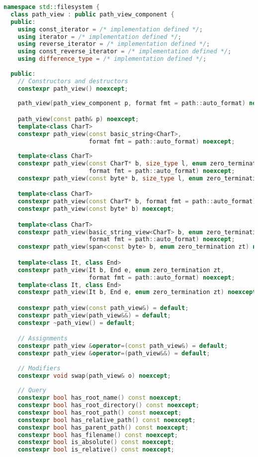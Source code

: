 \documentclass[11pt]{article}
\begin{document}
\begin{lstlisting}[language=cpp]
namespace std::filesystem {
  class path_view : public path_view_component {
  public:
    using const_iterator = /* implementation defined */;
    using iterator = /* implementation defined */;
    using reverse_iterator = /* implementation defined */;
    using const_reverse_iterator = /* implementation defined */;
    using difference_type = /* implementation defined */;
    
  public:
    // Constructors and destructors
    constexpr path_view() noexcept;
    
    path_view(path_view_component p, format fmt = path::auto_format) noexcept;

    path_view(const path& p) noexcept;
    template<class CharT>
    constexpr path_view(const basic_string<CharT>,
                        format fmt = path::auto_format) noexcept;
                        
    template<class CharT>
    constexpr path_view(const CharT* b, size_type l, enum zero_termination zt,
                        format fmt = path::auto_format) noexcept;
    constexpr path_view(const byte* b, size_type l, enum zero_termination zt) noexcept;

    template<class CharT>
    constexpr path_view(const CharT* b, format fmt = path::auto_format) noexcept;
    constexpr path_view(const byte* b) noexcept;

    template<class CharT>
    constexpr path_view(basic_string_view<CharT> b, enum zero_termination zt,
                        format fmt = path::auto_format) noexcept;
    constexpr path_view(span<const byte> b, enum zero_termination zt) noexcept;

    template<class It, class End>
    constexpr path_view(It b, End e, enum zero_termination zt,
                        format fmt = path::auto_format) noexcept;
    template<class It, class End>
    constexpr path_view(It b, End e, enum zero_termination zt) noexcept;

    constexpr path_view(const path_view&) = default;
    constexpr path_view(path_view&&) = default;
    constexpr ~path_view() = default;

    // Assignments
    constexpr path_view &operator=(const path_view&) = default;
    constexpr path_view &operator=(path_view&&) = default;
    
    // Modifiers
    constexpr void swap(path_view& o) noexcept;
    
    // Query
    constexpr bool has_root_name() const noexcept;
    constexpr bool has_root_directory() const noexcept;
    constexpr bool has_root_path() const noexcept;
    constexpr bool has_relative_path() const noexcept;
    constexpr bool has_parent_path() const noexcept;
    constexpr bool has_filename() const noexcept;
    constexpr bool is_absolute() const noexcept;
    constexpr bool is_relative() const noexcept;
    

\end{lstlisting}
\end{document}
